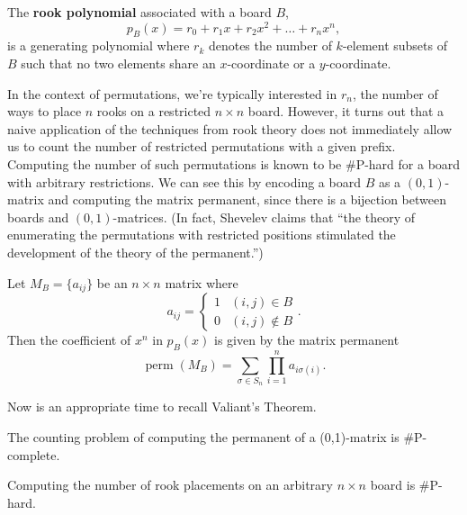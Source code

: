 \begin{definition}
  The \textbf{rook polynomial} associated with a board $B$,
  \begin{equation}
    p_B(x) = r_0 + r_1 x + r_2 x^2 + \dots + r_n x^n,
  \end{equation}
  is a generating polynomial where $r_k$ denotes the number of $k$-element subsets
  of $B$ such that no two elements share an $x$-coordinate or a $y$-coordinate.
\end{definition}

In the context of permutations, we're typically interested in $r_n$, the number
of ways to place $n$ rooks on a restricted $n \times n$ board.
However, it turns out that a naive application of the techniques from
rook theory does not immediately allow us to count the number of
restricted permutations with a given prefix.
Computing the number of such permutations is known to be \#P-hard
for a board with arbitrary restrictions.
We can see this by encoding a board $B$ as a $(0,1)$-matrix and computing the matrix
permanent, since there is a bijection between boards and $(0,1)$-matrices.
(In fact, Shevelev \cite{Shevelev1992} claims that
``the theory of enumerating the permutations with restricted positions
stimulated the development of the theory of the permanent.'')

\begin{lemma}
  Let $M_B = \{a_{ij}\}$ be an $n \times n$ matrix where \begin{equation}
    a_{ij} = \begin{cases}
      1 & (i,j) \in B \\
      0 & (i,j) \not\in B
    \end{cases}.
  \end{equation}
  Then the coefficient of $x^n$ in $p_B(x)$ is given by the matrix permanent
  \begin{equation}
    \operatorname{perm}(M_B) = \sum_{\sigma \in S_n} \prod_{i=1}^n a_{i\sigma(i)}.
  \end{equation}
\end{lemma}

Now is an appropriate time to recall Valiant's Theorem.

\begin{theorem}
  The counting problem of computing the permanent of a (0,1)-matrix is \#P-complete.
\end{theorem}

\begin{corollary}
  Computing the number of rook placements on an arbitrary $n \times n$ board is
  \#P-hard.
\end{corollary}

